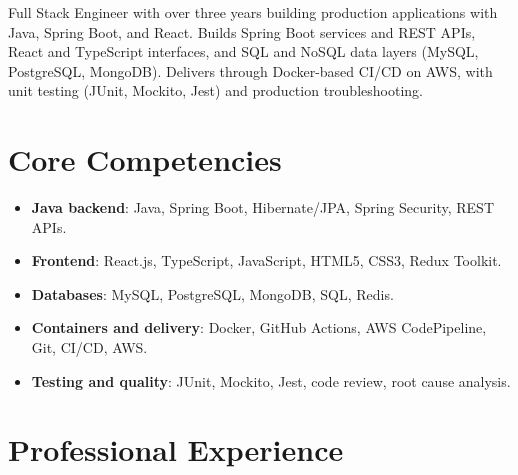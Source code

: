 \documentclass[11pt,a4paper,sans]{moderncv}
\begin{document}
\makecvtitle

\vspace{6pt}
{\small Full Stack Engineer with over three years building production applications with Java, Spring Boot, and React. Builds Spring Boot services and REST APIs, React and TypeScript interfaces, and SQL and NoSQL data layers (MySQL, PostgreSQL, MongoDB). Delivers through Docker-based CI/CD on AWS, with unit testing (JUnit, Mockito, Jest) and production troubleshooting.\par}

\section{Core Competencies}
\vspace{1pt}
\begin{itemize}

\item \textbf{Java backend}: Java, Spring Boot, Hibernate/JPA, Spring Security, REST APIs.

\item \textbf{Frontend}: React.js, TypeScript, JavaScript, HTML5, CSS3, Redux Toolkit.

\item \textbf{Databases}: MySQL, PostgreSQL, MongoDB, SQL, Redis.

\item \textbf{Containers and delivery}: Docker, GitHub Actions, AWS CodePipeline, Git, CI/CD, AWS.

\item \textbf{Testing and quality}: JUnit, Mockito, Jest, code review, root cause analysis.

\end{itemize}

\section{Professional Experience}
\vspace{3pt}
\end{document}
